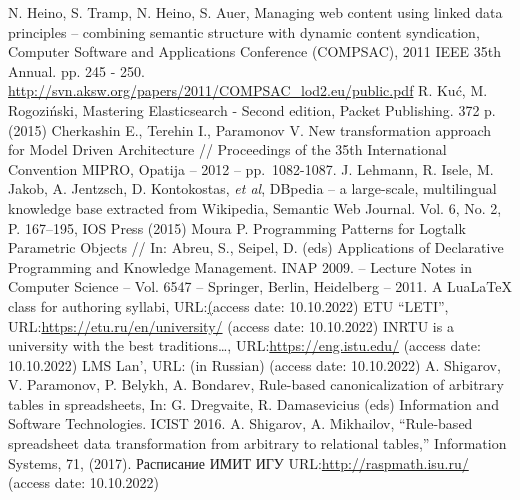 \documentclass[
]{aiitart}
\providecommand{\LuaLaTeX}{Lua\LaTeX}
\begin{document}
\begin{thebibliography}{99}
 N. Heino, S. Tramp, N. Heino, S. Auer, Managing web content using linked data principles – combining semantic structure with dynamic content syndication, Computer Software and Applications Conference (COMPSAC), 2011 IEEE 35th Annual. pp. 245 - 250.  \url{http://svn.aksw.org/papers/2011/COMPSAC_lod2.eu/public.pdf}
  R. Kuć, M. Rogoziński, Mastering Elasticsearch - Second edition, Packet
  Publishing. 372 p. (2015)
 Cherkashin E., Terehin I., Paramonov V. New transformation approach for Model Driven Architecture // Proceedings of the 35th International Convention MIPRO, Opatija -- 2012 -- pp.~1082-1087.
  J. Lehmann, R. Isele, M. Jakob, A. Jentzsch, D. Kontokostas, \textit{et al},
  DBpedia -- a large-scale, multilingual knowledge base extracted from
  Wikipedia, Semantic Web Journal. Vol. 6, No. 2, P. 167--195,
  IOS Press (2015)
Moura P. Programming Patterns for Logtalk Parametric Objects // In: Abreu, S., Seipel, D. (eds) Applications of Declarative Programming and Knowledge Management. INAP 2009. -- Lecture Notes in Computer Science -- Vol. 6547 -- Springer, Berlin, Heidelberg -- 2011. 
 A \LuaLaTeX{} class for authoring syllabi, URL:\href{https://github.com/eugeneai/sucourse} (access date: 10.10.2022)
 ETU “LETI”, URL:\url{https://etu.ru/en/university/} (access date: 10.10.2022)
 INRTU is a university with the best traditions\ldots, URL:\url{https://eng.istu.edu/} (access date: 10.10.2022)
 LMS  Lan', URL:\url{} (in Russian) (access date: 10.10.2022)
A. Shigarov, V. Paramonov, P. Belykh, A. Bondarev, Rule-based canonicalization of arbitrary tables in spreadsheets, In: G. Dregvaite, R. Damasevicius (eds) Information and Software Technologies. ICIST 2016.
A. Shigarov, A. Mikhailov, ``Rule-based spreadsheet data transformation from arbitrary to relational tables,'' Information Systems, 71, (2017). 
Расписание ИМИТ ИГУ URL:\url{http://raspmath.isu.ru/} (access date: 10.10.2022)
\end{thebibliography}
\end{document}
